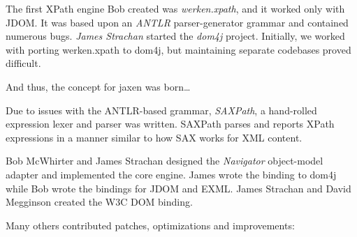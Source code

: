 \documentclass[20pt,landscape,headrule,footrule]{foils}
\begin{document}


The first XPath engine Bob created was \emph{werken.xpath}, and it
worked only with JDOM.  It was based upon an \emph{ANTLR} parser-generator grammar
and contained numerous bugs.  \emph{James Strachan} started the
\emph{dom4j} project.  Initially, we worked with porting
werken.xpath to dom4j, but maintaining separate codebases proved 
difficult.

And thus, the concept for jaxen was born\dots



Due to issues with the ANTLR-based grammar, \emph{SAXPath}, a
hand-rolled expression lexer and parser was written.   SAXPath parses
and reports XPath expressions in a manner similar to how SAX works
for XML content.

Bob McWhirter and James Strachan designed the \emph{Navigator}
object-model adapter and implemented the core engine.  James 
wrote the binding to dom4j while Bob wrote the bindings for
JDOM and EXML.  James Strachan and David Megginson created the
W3C DOM binding.



Many others contributed patches, optimizations and improvements:
\end{document}
